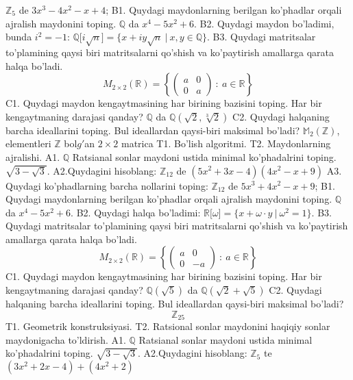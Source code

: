 \(\mathbb{Z}_{5}\) de \(3x^{3} - 4x^{2} - x + 4\);
B1. Quydagi maydonlarning berilgan ko'phadlar orqali ajralish maydonini toping.
\(\mathbb{Q}\) da \(x^{4} - 5x^{2} + 6\).
B2. Quydagi maydon bo'ladimi, bunda \(i^{2} = - 1\):
\(\mathbb{Q\lbrack}i\sqrt{n}\rbrack = \{ x + iy\sqrt{n}\ |\ x,y \in \mathbb{Q\}}\).
B3. Quydagi matritsalar to'plamining qaysi biri matritsalarni qo'shish va ko'paytirish amallarga qarata halqa bo'ladi.
\[M_{2 \times 2}\mathbb{(R) =}\left\{ \begin{pmatrix}
a & 0 \\
0 & a
\end{pmatrix}\ :\ a \in \mathbb{R} \right\}\]
C1. Quydagi maydon kengaytmasining har birining bazisini toping. Har bir kengaytmaning darajasi qanday?
\(\mathbb{Q}\) da \(\mathbb{Q}\left( \sqrt{2},\sqrt[3]{2} \right)\)
C2. Quydagi halqaning barcha ideallarini toping. Bul ideallardan qaysi-biri maksimal bo'ladi?
\(\mathbb{M}_{2}\left( \mathbb{Z} \right)\), elementleri \(\mathbb{Z}\) bol\(g'\)an \(2 \times 2\) matrica
T1. Bo'lish algoritmi.
T2. Maydonlarning ajralishi.
A1. \(\mathbb{Q}\) Ratsianal sonlar maydoni ustida minimal ko'phadalrini toping.
\(\sqrt{3 - \sqrt{3}}\).
A2.Quydagini hisoblang:
\(\mathbb{Z}_{12}\) de \(\left( 5x^{2} + 3x - 4 \right)\left( 4x^{2} - x + 9 \right)\)
A3. Quydagi ko'phadlarning barcha nollarini toping:
\(\mathbb{Z}_{12}\) de \(5x^{3} + 4x^{2} - x + 9\);
B1. Quydagi maydonlarning berilgan ko'phadlar orqali ajralish maydonini toping.
\(\mathbb{Q}\) da \(x^{4} - 5x^{2} + 6\).
B2. Quydagi halqa bo'ladimi:
\(\mathbb{R\lbrack}\omega\rbrack = \{ x + \omega \cdot y\ |\ \omega^{2} = 1\}\).
B3. Quydagi matritsalar to'plamining qaysi biri matritsalarni qo'shish va ko'paytirish amallarga qarata halqa bo'ladi.
\[M_{2 \times 2}\mathbb{(R) =}\left\{ \begin{pmatrix}
a & 0 \\
0 & - a
\end{pmatrix}\ :\ a \in \mathbb{R} \right\}\]
C1. Quydagi maydon kengaytmasining har birining bazisini toping. Har bir kengaytmaning darajasi qanday?
\(\mathbb{Q}\left( \sqrt{5} \right)\) da \(\mathbb{Q}\left( \sqrt{2} + \sqrt{5} \right)\)
C2. Quydagi halqaning barcha ideallarini toping. Bul ideallardan qaysi-biri maksimal bo'ladi?
\[\mathbb{Z}_{25}\]
T1. Geometrik konstruksiyasi.
T2. Ratsional sonlar maydonini haqiqiy sonlar maydonigacha to'ldirish.
A1. \(\mathbb{Q}\) Ratsianal sonlar maydoni ustida minimal ko'phadalrini toping.
\(\sqrt{3 - \sqrt{3}}\).
A2.Quydagini hisoblang:
\(\mathbb{Z}_{5}\) te \(\left( 3x^{2} + 2x - 4 \right) + \left( 4x^{2} + 2 \right)\)
